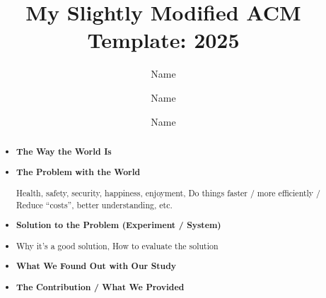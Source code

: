 \documentclass[sigconf, screen, review]{acmart}
\begin{document}

\title[shorty]{My Slightly Modified ACM Template: 2025}

\author{Name}
\author{Name}
\author{Name}

\renewcommand{\shortauthors}{FIRST et al.}

\begin{abstract}
	\begin{itemize}[label={}, leftmargin=0pt,itemsep=0pt, parsep=0pt] %
		\item \textbf{The Way the World Is}
		\item \textbf{The Problem with the World}
			  \par Health, safety, security, happiness, enjoyment, Do things faster / more efficiently / Reduce ``costs'', better understanding, etc.
		\item \textbf{Solution to the Problem (Experiment / System)}
		\item Why it’s a good solution, How to evaluate the solution
		\item \textbf{What We Found Out with Our Study}
		\item \textbf{The Contribution / What We Provided}
	\end{itemize}
\end{abstract}
\end{document}
